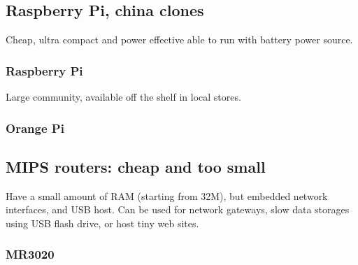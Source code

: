 \subsection{Raspberry Pi, china clones}

Cheap, ultra compact and power effective able to run with battery power source.

\subsubsection{Raspberry Pi}

Large community, available off the shelf in local stores.

\subsubsection{Orange Pi} 

\subsection{MIPS routers: cheap and too small}

Have a small amount of RAM (starting from 32M), but embedded network
interfaces, and USB host. Can be used for network gateways, slow data
storages using USB flash drive, or host tiny web sites.

\subsubsection{MR3020}
